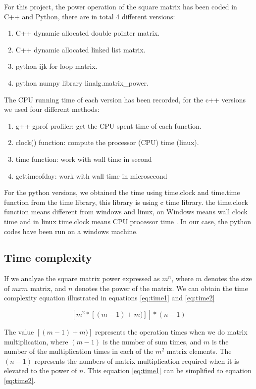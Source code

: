 \documentclass[12pt]{article}
\begin{document}
    For this project, the power operation of the square matrix has been coded in C++ and Python, there are in total 4 different versions: 
    \begin{enumerate}[label=\arabic*)]
        \item C++ dynamic allocated double pointer matrix.
        \item C++ dynamic allocated linked list matrix.
        \item python ijk for loop matrix.
        \item python numpy library linalg.matrix\_power.
    \end{enumerate}
    The CPU running time of each version has been recorded, for the c++ versions we used four different methods:
        \begin{enumerate}[label=\arabic*)] 
    \item g++ gprof profiler: get the CPU spent time of each function.
    \item clock() function: compute the processor (CPU) time (linux).
    \item time function: work with wall time in second
    \item gettimeofday: work with wall time in microsecond
        \end{enumerate}
    For the python versions, we obtained the time using time.clock and time.time function from the time library, this library is using c time library. 
    the time.clock function means different from windows and linux, on Windows means wall clock time and in linux time.clock means CPU processor time \cite{python.time}.
    In our case, the python codes have been run on a windows machine.
     
     \subsection{Time complexity}
    If we analyze the square matrix power expressed as  $ m^n $, where $m$ denotes the size of $mxm$ matrix, and $n$ denotes the power of the matrix.
    We can obtain the time complexity equation illustrated in equations \ref{eq:time1} and \ref{eq:time2}
     
     \begin{equation} \label{eq:time1}
      [m^2*[(m-1)+m)]]*(n-1)
     \end{equation}
    
    The value $[(m-1)+m)]$ represents the operation times when we do matrix multiplication, where  $(m-1)$ is the number of sum times, and $m$ is the number of the multiplication times in each of the $m^2$ matrix elements. The $(n-1)$ represents the numbers of matrix multiplication required when it is elevated to the power of $n$. This equation \ref{eq:time1} can be simplified to equation \ref{eq:time2}.
      
\end{document}
